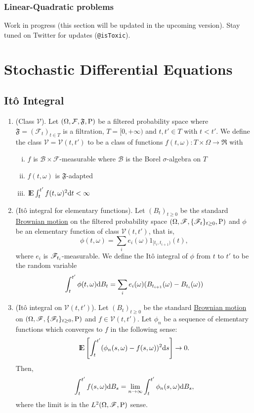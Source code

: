 \documentclass[a4paper,10pt]{scrbook}
\makeatletter
\newcommand{\comingSoon}{Work in progress (this section will be updated in the upcoming version). Stay tuned on Twitter for updates (\texttt{@isToxic}).}
\makeatother
\begin{document}
\subsection{Linear-Quadratic problems}


\comingSoon


\chapter{Stochastic Differential Equations}
\section{It{\^{o}} Integral}
\begin{enumerate}
 \item (Class \(\mathcal{V}\)). Let \((\Omega, \mathcal{F}, \mathfrak{F}, \mathrm{P})\) be a filtered probability space
       where \(\mathfrak{F} = (\mathcal{F}_t)_{t\in T}\) is a filtration, 
       \(T = [0, +\infty) \) and \(t, t' \in T\) with \(t < t'\). 
       We define the class \(\mathcal{V} = \mathcal{V}(t,t')\) to be a class of functions 
       \(f(t, \omega): T \times \Omega \to \Re\) with 
       \begin{enumerate}[i.]
        \item \(f\) is \(\mathcal{B}\times \mathcal{F}\)-measurable where \(\mathcal{B}\) is the 
              Borel \(\sigma\)-algebra on \(T\)
	\item \(f(t, \omega)\) is \(\mathfrak{F}\)-adapted
	\item \(\E\int_{t}^{t'} f(t,\omega)^2 \d t {}<{} \infty\)
       \end{enumerate}
       
 \item (It\^{o} integral for elementary functions). 
       Let \((B_t)_{t\geq 0}\) be the standard \hyperlink{link:brownian_motion}{Brownian motion} 
       on the filtered probability space \((\Omega, \mathscr{F}, \{\mathscr{F}_t\}_{t\geq 0}, \mathrm{P})\) and \(\phi\) be 
       an elementary function of class \(\mathcal{V}(t, t')\), that is,
       \[
        \phi(t, \omega) = \sum_{i}e_i(\omega) 1_{[t_i, t_{i+1})}(t),
       \]
       where \(e_i\) is \(\mathscr{F}_{t_i}\)-measurable.
       We define the It\^{o} integral of \(\phi\) from \(t\) to \(t'\) 
       to be the random variable
       \[
        \int_t^{t'} \phi(t, \omega) \mathrm{d} B_t = \sum_i e_i(\omega) (B_{t_{i+1}}(\omega) - B_{t_i}(\omega))
       \]
       

 \item  (It\^{o} integral on \(\mathcal{V}(t, t')\)).
        Let \((B_t)_{t\geq 0}\) be the standard \hyperlink{link:brownian_motion}{Brownian motion} 
       on \((\Omega, \mathscr{F}, \{\mathscr{F}_t\}_{t\geq 0}, \mathrm{P})\) and \(f \in \mathcal{V}(t, t')\). Let \(\phi_n\)
       be a sequence of elementary functions which converges to \(f\) in the following sense:
       \[
        \E \left[\int_{t}^{t'}(\phi_n(s, \omega) - f(s, \omega))^2\d s\right] \to 0.
       \]
       Then,
       \[
        \int_{t}^{t'} f(s, \omega)\mathrm{d} B_s = \lim_{n\to \infty} \int_{t}^{t'} \phi_n(s, \omega)\mathrm{d} B_s,
       \]
       where the limit is in the \(L^2(\Omega,\mathscr{F},\mathrm{P})\) sense.


\end{enumerate}
\end{document}
